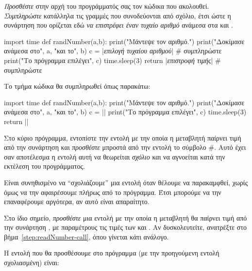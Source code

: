 \documentclass[a4paper,11pt,oneside]{book}
\begin{document}
\begin{step}
\label{step:readNumber-call}
\emph{Προσθέστε} στην αρχή του προγράμματός σας τον κώδικα που ακολουθεί. \emph{Συμπληρώστε} κατάλληλα τις γραμμές που συνοδεύονται από σχόλιο, έτσι ώστε η συνάρτηση  που ορίζεται εδώ \emph{να επιστρέφει έναν τυχαίο αριθμό} ανάμεσα στα  και .

\begin{pynew}
import time
def randNumber(a,b):
    print("Μάντεψε τον αριθμό.")
    print("Δοκίμασε ανάμεσα στο", a, "και το", b)
    c = |\textrm{\textit{επιλογή τυχαίου αριθμού}}|             # συμπληρώστε
    print("Το πρόγραμμα επιλέγει", c)
    time.sleep(3)
    return |\textrm{\textit{επιστροφή τιμής}}|                # συμπληρώστε
\end{pynew}

\begin{answer}
Το τμήμα κώδικα θα συμπληρωθεί όπως παρακάτω:

\begin{pyplain}
import time
def randNumber(a,b):
    print("Μάντεψε τον αριθμό.")
    print("Δοκίμασε ανάμεσα στο", a, "και το", b)
    c = ||
    print("Το πρόγραμμα επιλέγει", c)
    time.sleep(3)
    return ||
\end{pyplain}
\end{answer}

Στο κύριο πρόγραμμα, εντοπίστε την εντολή με την οποία η μεταβλητή  παίρνει τιμή από την συνάρτηση  και \emph{προσθέστε} μπροστά από την εντολή το σύμβολο \#. Αυτό έχει σαν αποτέλεσμα η εντολή αυτή να θεωρείται \emph{σχόλιο} και να αγνοείται κατά την εκτέλεση του προγράμματος.

\begin{note}
Είναι συνηθισμένο να ``σχολιάζουμε'' μια εντολή όταν θέλουμε να παρακαμφθεί, χωρίς όμως να την αφαιρέσουμε πλήρως από το πρόγραμμα. Έτσι μπορούμε να την επαναφέρουμε αργότερα, αν αυτό είναι απαραίτητο.
\end{note}

Στο ίδιο σημείο, \emph{προσθέστε} μια εντολή με την οποία η μεταβλητή  θα παίρνει τιμή από την συνάρτηση , με παραμέτρους τις τιμές των  και . Αν δυσκολευτείτε, ανατρέξτε στο βήμα~\ref{step:readNumber-call}, όπου γίνεται κάτι ανάλογο.

\begin{answer}
Η εντολή που θα προσθέσουμε στο πρόγραμμα (με την προηγούμενη εντολή σχολιασμένη) είναι:


\end{answer}
\end{step}
\end{document}
